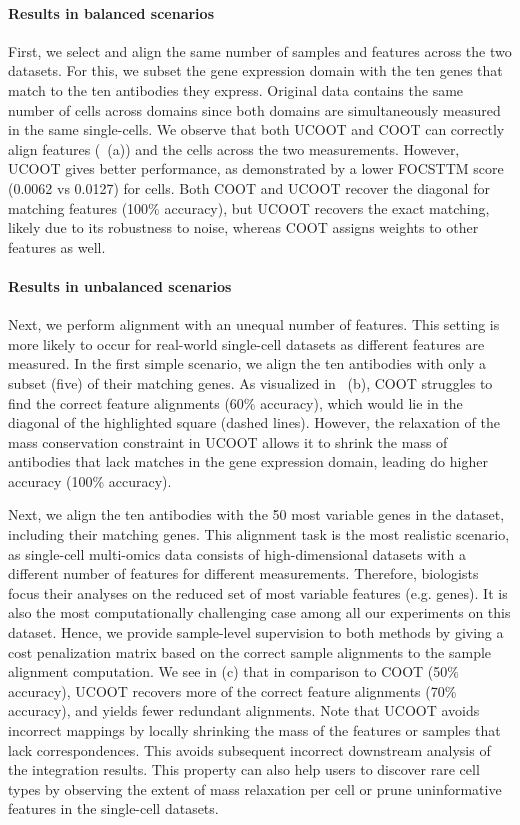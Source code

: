 \paragraph{Results in balanced scenarios} First, we select and align the same number of samples and features
across the two datasets. For this, we subset the gene expression domain with the ten genes that
match to the ten antibodies they express. Original data contains the same number of cells
across domains since both domains are simultaneously measured in the same single-cells.
We observe that both UCOOT and COOT can correctly align features (~(a))
and the cells across the two measurements. However,
UCOOT gives better performance, as demonstrated by a lower FOCSTTM score (0.0062 vs 0.0127)
for cells. Both COOT and UCOOT recover the diagonal for matching features (100\% accuracy),
but UCOOT recovers the exact matching, likely due to its robustness to noise,
whereas COOT assigns weights to other features as well.

\paragraph{Results in unbalanced scenarios} Next, we perform alignment with an unequal number of features.
This setting is more likely to occur for real-world single-cell datasets as different features
are measured. In the first simple scenario, we align the ten antibodies with only a subset (five)
of their matching genes. As visualized in ~(b),
COOT struggles to find the correct feature alignments (60\% accuracy),
which would lie in the diagonal of the highlighted square (dashed lines). However,
the relaxation of the mass conservation constraint in UCOOT allows it to shrink
the mass of antibodies that lack matches in the gene expression domain,
leading do higher accuracy (100\% accuracy).

Next, we align the ten antibodies with
the 50 most variable genes in the dataset, including their matching genes.
This alignment task is the most realistic scenario, as single-cell multi-omics data
consists of high-dimensional datasets with a different number of features for different measurements.
Therefore, biologists focus their analyses on the reduced set of most variable features (e.g. genes).
It is also the most computationally challenging case among all our experiments on this dataset.
Hence, we provide sample-level supervision to both methods by giving a cost penalization matrix
based on the correct sample alignments to the sample alignment computation.
We see in (c) that in comparison to COOT (50\% accuracy),
UCOOT recovers more of the correct feature alignments (70\% accuracy),
and yields fewer redundant alignments.
Note that UCOOT avoids incorrect mappings by locally shrinking the mass of the features or samples
that lack correspondences. This avoids subsequent incorrect downstream analysis of
the integration results. This property can also help users to discover rare cell types
by observing the extent of mass relaxation per cell or prune uninformative features in
the single-cell datasets.

